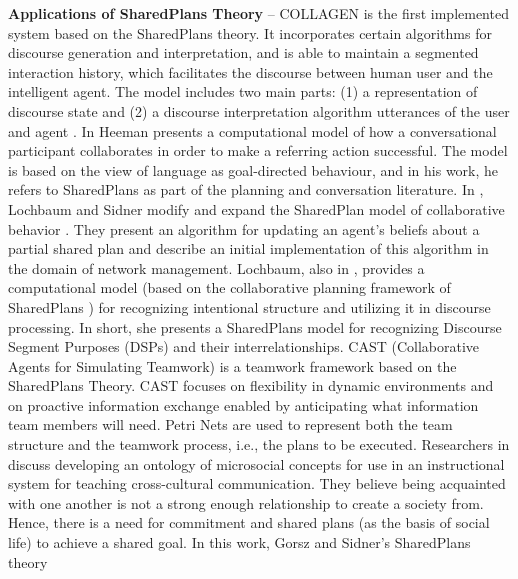 \documentclass[11pt]{article}
\begin{document}
\textbf{Applications of SharedPlans Theory} -- COLLAGEN
\cite{rich:collaboration-manager, rich:discourse} is the first implemented
system based on the SharedPlans theory. It incorporates certain algorithms for
discourse generation and interpretation, and is able to maintain a segmented
interaction history, which facilitates the discourse between human user and the
intelligent agent. The model includes two main parts: (1) a representation of
discourse state and (2) a discourse interpretation algorithm utterances of the
user and agent \cite{rickel:discourse-theory-dialogue}. In
\cite{heeman:model-collaboration-referring} Heeman presents a computational
model of how a conversational participant collaborates in order to make a
referring action successful. The model is based on the view of language as
goal-directed behaviour, and in his work, he refers to SharedPlans as part of
the planning and conversation literature. In \cite{lochbaum:plan-models},
Lochbaum and Sidner modify and expand the SharedPlan model of collaborative
behavior \cite{grosz:plans-discourse}. They present an algorithm for updating an
agent’s beliefs about a partial shared plan and describe an initial
implementation of this algorithm in the domain of network management. Lochbaum,
also in \cite{lochbaum:collaborative-planning}, provides a computational model
(based on the collaborative planning framework of SharedPlans
\cite{grosz:collaboration}) for recognizing intentional structure and utilizing
it in discourse processing. In short, she presents a SharedPlans model for
recognizing Discourse Segment Purposes (DSPs) \cite{grosz:plans-discourse}
\cite{sidner:discourse-collaborative-negotiation} and their interrelationships.
CAST (Collaborative Agents for Simulating Teamwork) \cite{yen:cast}
\cite{yin:knowledge-based-sharedplans} is a teamwork framework based on the
SharedPlans Theory. CAST focuses on flexibility in dynamic environments and on
proactive information exchange enabled by anticipating what information team
members will need. Petri Nets are used to represent both the team structure and
the teamwork process, i.e., the plans to be executed. Researchers in
\cite{hobbs:microsociology-relationship} discuss developing an ontology of
microsocial concepts for use in an instructional system for teaching
cross-cultural communication. They believe being acquainted with one another is
not a strong enough relationship to create a society from. Hence, there is a
need for commitment and shared plans (as the basis of social life) to achieve a
shared goal. In this work, Gorsz and Sidner's SharedPlans theory
\end{document}
